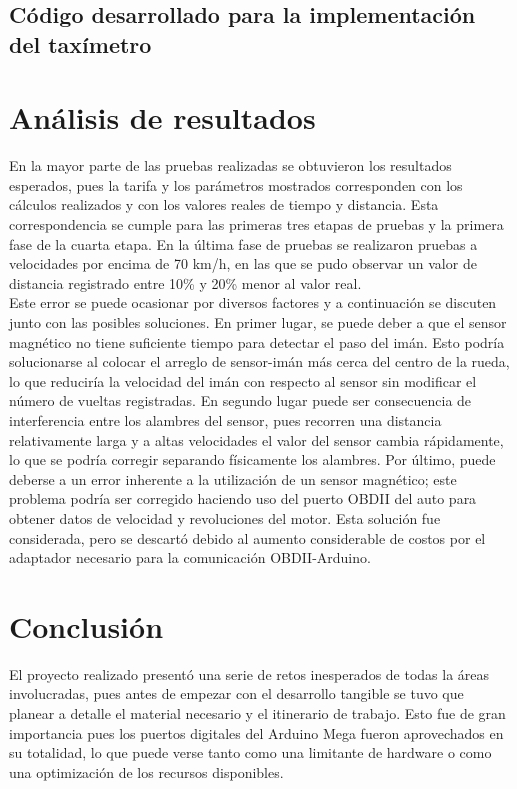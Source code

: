 \documentclass[a4paper,11pt]{article}
\begin{document}
\newpage
\subsection*{Código desarrollado para la implementación del taxímetro}



\section*{Análisis de resultados}
En la mayor parte de las pruebas realizadas se obtuvieron los resultados esperados, 
pues la tarifa y los parámetros mostrados corresponden con los cálculos realizados y con los 
valores reales de tiempo y distancia. Esta correspondencia se cumple para las primeras tres etapas de 
pruebas y la primera fase de la cuarta etapa. En la última fase de pruebas se realizaron pruebas a 
velocidades por encima de 70 km/h, en las que se pudo observar un valor de distancia registrado 
entre 10\% y 20\% menor al valor real. 
\\
Este error se puede ocasionar por diversos factores y a continuación se discuten junto con 
las posibles soluciones. En primer lugar, se puede deber a que el sensor magnético no tiene 
suficiente tiempo para detectar el paso del imán. Esto podría solucionarse al colocar el arreglo
 de sensor-imán más cerca del centro de la rueda, lo que reduciría la velocidad del imán con respecto 
 al sensor sin modificar el número de vueltas registradas. En segundo lugar puede ser consecuencia de 
 interferencia entre los alambres del sensor, pues recorren una distancia relativamente larga y a altas 
 velocidades el valor del sensor cambia rápidamente, lo que se podría corregir separando físicamente los 
alambres. Por último, puede deberse a un error inherente a la utilización de un sensor magnético; 
este problema podría ser corregido haciendo uso del puerto OBDII del auto para obtener datos de
 velocidad y revoluciones del motor. Esta solución fue considerada, pero se descartó debido al aumento 
 considerable de costos por el adaptador necesario para la comunicación OBDII-Arduino.
 
 

\section*{Conclusión}
El proyecto realizado presentó una serie de retos inesperados de todas la áreas involucradas, pues antes de empezar con el desarrollo tangible se tuvo que planear a detalle el material necesario y el itinerario de trabajo. Esto fue de gran importancia pues los puertos digitales del Arduino Mega fueron aprovechados en su totalidad, lo que puede verse tanto como una limitante de hardware o como una optimización de los recursos disponibles. 
\end{document}
